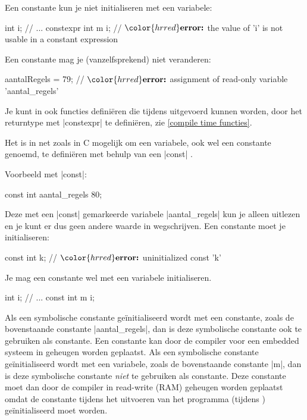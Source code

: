 \begin{cpplstShortInline}
Een  constante kun je niet initialiseren met een variabele:
\begin{cpplstfragment}[mathescape=true]
int i;
//  ...
constexpr int m {i};
//  $\color{hrred}\textbf{error:}$ the value of 'i' is not usable in a constant expression
\end{cpplstfragment}

Een  constante mag je (vanzelfsprekend) niet veranderen:
\begin{cpplstfragment}[mathescape=true]
aantalRegels = 79;
//  $\color{hrred}\textbf{error:}$ assignment of read-only variable 'aantal_regels'
\end{cpplstfragment}

Je kunt in \Cpp{} ook functies definiëren die tijdens  uitgevoerd kunnen worden, door het returntype met |constexpr| te definiëren, zie \cref{compile time functies}. 

\label{sec:const}
Het is in \Cpp{} net zoals in C mogelijk om een  variabele, ook wel een constante genoemd, te definiëren met behulp van een |const| . 

Voorbeeld met |const|:
\begin{cpplstfragment}
const int aantal_regels {80};
\end{cpplstfragment}

Deze met een |const|  gemarkeerde variabele |aantal_regels| kun je alleen uitlezen en je kunt er dus geen andere waarde in wegschrijven. Een constante moet je initialiseren:
\begin{cpplstfragment}[mathescape=true]
const int k;
//  $\color{hrred}\textbf{error:}$ uninitialized const 'k'
\end{cpplstfragment}

Je mag een constante wel met een variabele initialiseren.

\begin{cpplstfragment}
int i;
//  ...
const int m {i};
\end{cpplstfragment}

Als een symbolische constante geïnitialiseerd wordt met een  constante, zoals de bovenstaande constante |aantal_regels|, dan is deze symbolische constante ook te gebruiken als  constante. 
Een  constante kan door de compiler voor een embedded systeem in  geheugen worden geplaatst. 
Als een symbolische constante geïnitialiseerd wordt met een variabele, zoals de bovenstaande constante |m|, dan is deze symbolische constante \emph{niet} te gebruiken als  constante. 
Deze constante moet dan door de compiler in read-write (RAM) geheugen worden geplaatst omdat de constante tijdens het uitvoeren van het programma (tijdens ) geïnitialiseerd moet worden.


\end{cpplstShortInline}
